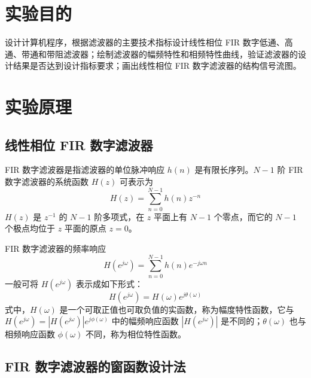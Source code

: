 \documentclass[12pt,AutoFakeBold]{article}
\begin{document}
\maketitle
\setcounter{tocdepth}{2}
\tableofcontents  %

\makeatletter
\begin{center}
    \LARGE \textbf{\textsf{\@problem}}
\end{center}
\makeatother

\section{实验目的}

设计计算机程序，根据滤波器的主要技术指标设计线性相位 FIR 数字低通、高通、带通和带阻滤波器；绘制滤波器的幅频特性和相频特性曲线，验证滤波器的设计结果是否达到设计指标要求；画出线性相位 FIR 数字滤波器的结构信号流图。

\section{实验原理}

\subsection{线性相位 FIR 数字滤波器}

FIR 数字滤波器是指滤波器的单位脉冲响应 $h(n)$ 是有限长序列。$N-1$ 阶 FIR 数字滤波器的系统函数 $H(z)$ 可表示为
%
\begin{equation}
H(z)=\sum_{n=0}^{N-1}h(n)z^{-n}
\end{equation}
%
$H(z)$ 是 $z^{-1}$ 的 $N-1$ 阶多项式，在 $z$ 平面上有 $N-1$ 个零点，而它的 $N-1$ 个极点均位于 $z$ 平面的原点 $z=0$。

FIR 数字滤波器的频率响应
%
\begin{equation}
H(e^{j\omega})=\sum_{n=0}^{N-1}h(n)e^{-j\omega n}
\end{equation}
%
一般可将 $H(e^{j\omega})$ 表示成如下形式：
%
\begin{equation}
H(e^{j\omega})=H(\omega)e^{j\theta(\omega)}
\end{equation}
%
式中，$H(\omega)$ 是一个可取正值也可取负值的实函数，称为幅度特性函数，它与 $H(e^{j\omega})=|H(e^{j\omega})|e^{j\phi(\omega)}$ 中的幅频响应函数 $|H(e^{j\omega})|$ 是不同的；$\theta(\omega)$ 也与相频响应函数 $\phi(\omega)$ 不同，称为相位特性函数。

\subsection{FIR 数字滤波器的窗函数设计法}
\end{document}
